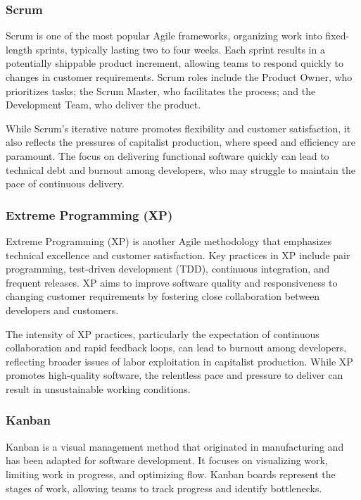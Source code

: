 \begin{refsection}
\begin{multicols}{2}
{\subsubsection{Scrum}

Scrum is one of the most popular Agile frameworks, organizing work into fixed-length sprints, typically lasting two to four weeks. Each sprint results in a potentially shippable product increment, allowing teams to respond quickly to changes in customer requirements. Scrum roles include the Product Owner, who prioritizes tasks; the Scrum Master, who facilitates the process; and the Development Team, who deliver the product.

While Scrum’s iterative nature promotes flexibility and customer satisfaction, it also reflects the pressures of capitalist production, where speed and efficiency are paramount. The focus on delivering functional software quickly can lead to technical debt and burnout among developers, who may struggle to maintain the pace of continuous delivery.

\subsubsection{Extreme Programming (XP)}

Extreme Programming (XP) is another Agile methodology that emphasizes technical excellence and customer satisfaction. Key practices in XP include pair programming, test-driven development (TDD), continuous integration, and frequent releases. XP aims to improve software quality and responsiveness to changing customer requirements by fostering close collaboration between developers and customers.

The intensity of XP practices, particularly the expectation of continuous collaboration and rapid feedback loops, can lead to burnout among developers, reflecting broader issues of labor exploitation in capitalist production. While XP promotes high-quality software, the relentless pace and pressure to deliver can result in unsustainable working conditions.

\subsubsection{Kanban}

Kanban is a visual management method that originated in manufacturing and has been adapted for software development. It focuses on visualizing work, limiting work in progress, and optimizing flow. Kanban boards represent the stages of work, allowing teams to track progress and identify bottlenecks.

}
\end{multicols}
\end{refsection}
